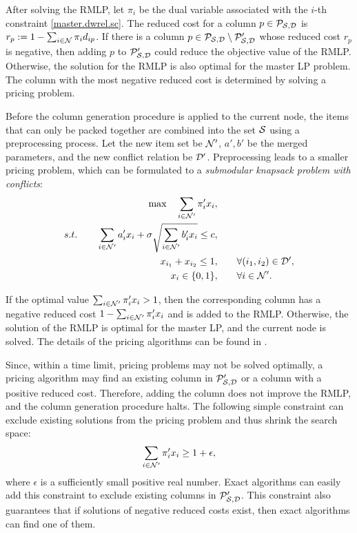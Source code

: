 After solving the RMLP, let \(\pi_i\) be the dual variable associated with the \(i\)-th constraint \eqref{master.dwrel.sc}. The reduced cost for a column $p \in \mathcal P_{\mathcal S,\mathcal D}$ is \(r_p := 1 - \sum_{i \in \mathcal N} \pi_i d_{ip}\). If there is a column \(p \in \mathcal P_{\mathcal S,\mathcal D} \setminus \mathcal P'_{\mathcal S,\mathcal D}\) whose reduced cost \(r_p\) is negative, then adding \(p\) to \(\mathcal P'_{\mathcal S,\mathcal D}\) could reduce the objective value of the RMLP. Otherwise, the solution for the RMLP is also optimal for the master LP problem. The column with the most negative reduced cost is determined by solving a pricing problem.

Before the column generation procedure is applied to the current node, the items that can only be packed together are combined into the set $\mathcal S$ using a preprocessing process. Let the new item set be $\mathcal N'$, $a',b'$ be the merged parameters, and the new conflict relation be $\mathcal D'$. Preprocessing leads to a smaller pricing problem, which can be formulated to a \textit{submodular knapsack problem with conflicts}:
 \begin{subequations}
 \label{pricing.ref}
 \begin{align}
  \max \quad \sum_{i\in \mathcal N'} \pi'_i x_i, \qquad& \\
  s.t. \qquad \sum_{i \in \mathcal N'} a'_i x_i + \sigma\sqrt{\sum_{i\in \mathcal N'} b'_i x_i } \le c,\qquad& \label{pricing.ref.cap}\\
  x_{i_1} + x_{i_2} \le 1, \qquad & \forall (i_1, i_2) \in \mathcal D',\label{pricing.ref.conflict}\\
  x_i \in \{0,1\},\qquad & \forall i \in \mathcal N'.
 \end{align}
 \end{subequations}

If the optimal value $\sum_{i\in \mathcal N'} \pi'_i x_i > 1$, then the corresponding column has a negative reduced cost $1 - \sum_{i\in \mathcal N'} \pi'_i x_i $ and is added to the RMLP. Otherwise, the solution of the RMLP is optimal for the master LP, and the current node is solved. The details of the pricing algorithms can be found in .

 
 Since, within a time limit, pricing problems may not be solved optimally, a pricing algorithm may find an existing column in $\mathcal P'_{\mathcal S,\mathcal D}$ or a column with a positive reduced cost. Therefore, adding the column does not improve the RMLP, and the column generation procedure halts. The following simple constraint can exclude existing solutions from the pricing problem and thus shrink the search space:
 \begin{equation}
     \label{cons.exclude}
     \sum_{i\in \mathcal N'} \pi'_i x_i \ge  1 + \epsilon,
 \end{equation}
 where $\epsilon$ is a sufficiently small positive real number. Exact algorithms can easily add this constraint to exclude existing columns in $\mathcal P'_{\mathcal S,\mathcal D}$. This constraint  also guarantees that if  solutions of negative reduced costs exist, then exact algorithms can find one of them.
 

